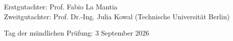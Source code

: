 \begin{titlepage}
{\noindent\normalsize
Erstgutachter: Prof. Fabio La Mantia\\[0.5em]
Zweitgutachter: Prof. Dr.-Ing. Julia Kowal (Technische Universität Berlin)
\par}

\vspace{1cm}


{\noindent\normalsize
Tag der mündlichen Prüfung: 3 September 2026
\par}

\vspace{2cm}

\end{titlepage}